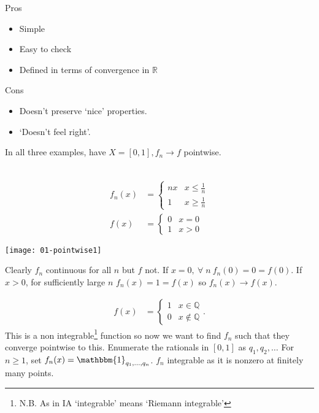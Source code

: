 Pros
\begin{itemize}
    \item Simple
    \item Easy to check
    \item Defined in terms of convergence in $\mathbb{R}$
\end{itemize} 
Cons
\begin{itemize}
    \item Doesn't preserve `nice' properties.
    \item `Doesn't feel right'.
\end{itemize} 

In all three examples, have $X = [0, 1], f_n \to f$ pointwise.

\begin{example} ~\vspace*{-1.5\baselineskip}
    \begin{align*}
        f_n(x) &= \begin{cases}
            nx & x \leq \frac{1}{n} \\
            1 & x \geq \frac{1}{n}
        \end{cases} \\
        f(x) &= \begin{cases}
            0 & x= 0 \\
            1 & x> 0
        \end{cases} 
    \end{align*} 
    {\par
        \centering 
        \texttt{[image: 01-pointwise1]} 
    \par}
    Clearly $f_n$ continuous for all $n$ but $f$ not.
    If $x = 0,\ \forall \; n \ f_n(0) = 0 = f(0)$.
    If $x > 0$, for sufficiently large $n$ $f_n(x) = 1 = f(x)$ so $f_n(x) \to f(x)$.
\end{example} 

\begin{example}
    \begin{align*}
        f(x) &= \begin{cases}
            1 & x \in \mathbb{Q} \\
            0 & x \notin \mathbb{Q}
        \end{cases}.
    \end{align*} 
    This is a non integrable\footnote{N.B. As in IA `integrable' means `Riemann integrable'} function so now we want to find $f_n$ such that they converge pointwise to this.
    Enumerate the rationals in $[0, 1]$ as $q_1, q_2, \dots$
    For $n \geq 1$, set $f_n(x) = \mathbbm{1}_{q_1, \dots, q_n}$. 
    $f_n$ integrable as it is nonzero at finitely many points.
\end{example} 

